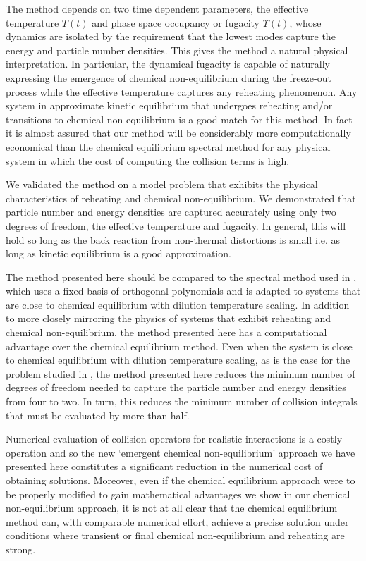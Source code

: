 The method depends on two time dependent parameters, the effective temperature $T(t)$ and phase space occupancy or fugacity $\Upsilon(t)$, whose dynamics are isolated by the requirement that the lowest modes capture the energy and particle number densities.  This gives the method a natural physical interpretation.  In particular, the dynamical fugacity is capable of naturally expressing the emergence of chemical non-equilibrium during the freeze-out process while the effective temperature captures any reheating phenomenon. Any system in approximate kinetic equilibrium that undergoes reheating and/or transitions to chemical non-equilibrium is a good match for this method.  In fact it is almost assured that our method will be considerably more computationally economical than the chemical equilibrium spectral method for any physical system in which the cost of computing the collision terms is high.

We validated the method on a model problem that exhibits the physical characteristics of reheating and chemical non-equilibrium.  We demonstrated that particle number and energy densities are captured accurately using only two degrees of freedom, the effective temperature and fugacity.  In general, this will hold so long as the back reaction from non-thermal distortions is small i.e. as long as kinetic equilibrium is a good approximation. 

The method presented here should be compared to the spectral method used in \cite{Esposito2000,Mangano2002}, which uses a fixed basis of orthogonal polynomials and is adapted to systems that are close to chemical equilibrium with dilution temperature scaling.  In addition to more closely mirroring the physics of systems that exhibit reheating and chemical non-equilibrium, the method presented here has a computational advantage over the chemical equilibrium method. Even when the system is close to chemical equilibrium with dilution temperature scaling, as is the case for the problem studied in \cite{Esposito2000,Mangano2002}, the method presented here reduces the minimum number of degrees of freedom needed to capture the particle number and energy densities from four to two.  In turn, this reduces the minimum number of collision integrals that must be evaluated by more than half.  

Numerical evaluation of collision operators for realistic interactions is a costly operation and so the new `emergent chemical non-equilibrium' approach we have presented here constitutes a significant reduction in the numerical cost of obtaining solutions. Moreover, even if the chemical equilibrium approach were to be properly modified to gain mathematical advantages we show  in our chemical non-equilibrium approach, it is not at all clear that the chemical equilibrium method can, with comparable numerical effort, achieve  a precise solution under conditions where transient or final chemical non-equilibrium and reheating are strong.

